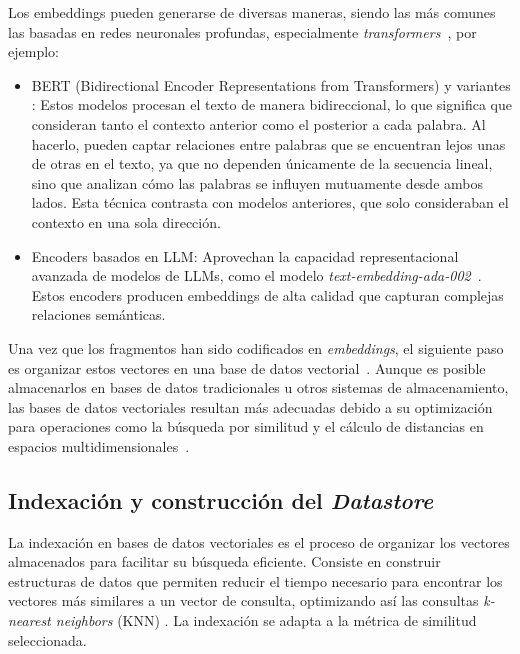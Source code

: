 Los embeddings pueden generarse de diversas maneras, siendo las más comunes las basadas en redes neuronales profundas, especialmente \textit{transformers}~\cite{vaswani2017attention}, por ejemplo:

\begin{itemize} 
    \item BERT (Bidirectional Encoder Representations from Transformers) y variantes \cite{rajaraman2011data}: Estos modelos procesan el texto de manera bidireccional, lo que significa que consideran tanto el contexto anterior como el posterior a cada palabra. Al hacerlo, pueden captar relaciones entre palabras que se encuentran lejos unas de otras en el texto, ya que no dependen únicamente de la secuencia lineal, sino que analizan cómo las palabras se influyen mutuamente desde ambos lados. Esta técnica contrasta con modelos anteriores, que solo consideraban el contexto en una sola dirección.
    \item Encoders basados en LLM: Aprovechan la capacidad representacional avanzada de modelos de LLMs, como el modelo \textit{text-embedding-ada-002}~\cite{openai2022textembada}. Estos encoders producen embeddings de alta calidad que capturan complejas relaciones semánticas.
\end{itemize}

Una vez que los fragmentos han sido codificados en \textit{embeddings}, el siguiente paso es organizar estos vectores en una base de datos vectorial~\cite{wu2024retrievalaugmentedgenerationnaturallanguage}. Aunque es posible almacenarlos en bases de datos tradicionales u otros sistemas de almacenamiento, las bases de datos vectoriales resultan más adecuadas debido a su optimización para operaciones como la búsqueda por similitud y el cálculo de distancias en espacios multidimensionales~\cite{han2023comprehensivesurveyvectordatabase}.

\subsection{Indexación y construcción del \textit{Datastore}}

La indexación en bases de datos vectoriales es el proceso de organizar los vectores almacenados para facilitar su búsqueda eficiente. Consiste en construir estructuras de datos que permiten reducir el tiempo necesario para encontrar los vectores más similares a un vector de consulta, optimizando así las consultas \textit{k-nearest neighbors} (KNN) \cite{johnson2021billion}. La indexación se adapta a la métrica de similitud seleccionada.

